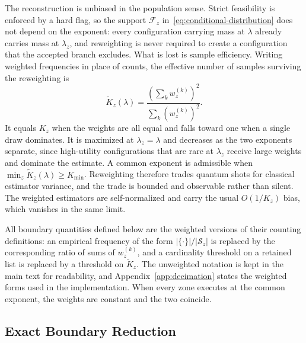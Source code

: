 \documentclass[journal]{IEEEtran}
\newcommand{\calF}{\mathcal{F}}  %
\newcommand{\calS}{\mathcal{S}}  %
\begin{document}
The reconstruction is unbiased in the population sense. Strict feasibility is enforced by a hard flag, so the support $\calF_z$ in~\eqref{eq:conditional-distribution} does not depend on the exponent: every configuration carrying mass at $\lambda$ already carries mass at $\lambda_z$, and reweighting is never required to create a configuration that the accepted branch excludes. What is lost is sample efficiency. Writing weighted frequencies in place of counts, the effective number of samples surviving the reweighting is
\begin{equation}
\label{eq:ess}
\widetilde{K}_z(\lambda)=
\frac{\left(\sum_k w_z^{(k)}\right)^{2}}
{\sum_k\left(w_z^{(k)}\right)^{2}} .
\end{equation}
It equals $K_z$ when the weights are all equal and falls toward one when a single draw dominates. It is maximized at $\lambda_z=\lambda$ and decreases as the two exponents separate, since high-utility configurations that are rare at $\lambda_z$ receive large weights and dominate the estimate. A common exponent is admissible when $\min_z\widetilde{K}_z(\lambda)\ge K_{\min}$. Reweighting therefore trades quantum shots for classical estimator variance, and the trade is bounded and observable rather than silent. The weighted estimators are self-normalized and carry the usual $O(1/K_z)$ bias, which vanishes in the same limit.

All boundary quantities defined below are the weighted versions of their counting definitions: an empirical frequency of the form $|\{\cdot\}|/|\calS_z|$ is replaced by the corresponding ratio of sums of $w_z^{(k)}$, and a cardinality threshold on a retained list is replaced by a threshold on $\widetilde{K}_z$. The unweighted notation is kept in the main text for readability, and Appendix~\ref{app:decimation} states the weighted forms used in the implementation. When every zone executes at the common exponent, the weights are constant and the two coincide.

\subsection{Exact Boundary Reduction}
\label{sec:decomposition}
\end{document}
